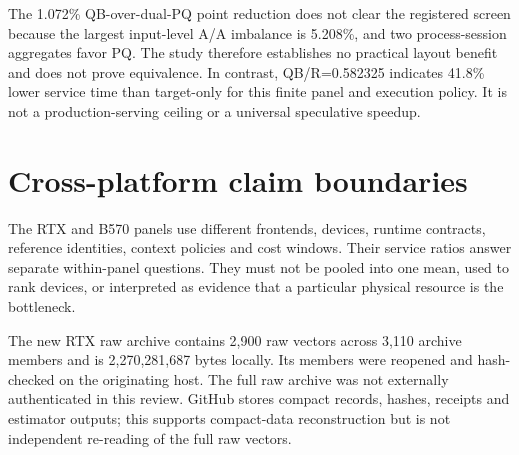 The 1.072\% QB-over-dual-PQ point reduction does not clear the registered screen because the largest input-level A/A imbalance is 5.208\%, and two process-session aggregates favor PQ. The study therefore establishes no practical layout benefit and does not prove equivalence. In contrast, QB/R=0.582325 indicates 41.8\% lower service time than target-only for this finite panel and execution policy. It is not a production-serving ceiling or a universal speculative speedup.

\section{Cross-platform claim boundaries}
\label{app:boundaries}
The RTX and B570 panels use different frontends, devices, runtime contracts, reference identities, context policies and cost windows. Their service ratios answer separate within-panel questions. They must not be pooled into one mean, used to rank devices, or interpreted as evidence that a particular physical resource is the bottleneck.

The new RTX raw archive contains 2,900 raw vectors across 3,110 archive members and is 2,270,281,687 bytes locally. Its members were reopened and hash-checked on the originating host. The full raw archive was not externally authenticated in this review. GitHub stores compact records, hashes, receipts and estimator outputs; this supports compact-data reconstruction but is not independent re-reading of the full raw vectors.
